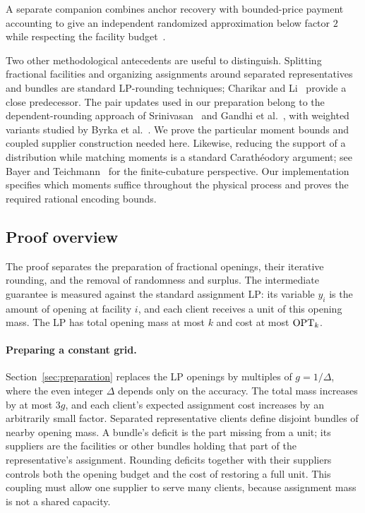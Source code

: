 A separate companion combines anchor recovery with bounded-price payment
accounting to give an independent randomized approximation below factor
\(2\) while respecting the facility budget~\cite[Theorem~1.2]{OpenAIRecovery2026}.

Two other methodological antecedents are useful to distinguish.
Splitting fractional facilities and organizing assignments around
separated representatives and bundles are standard LP-rounding
techniques; Charikar and Li~\cite{CharikarLi2012} provide a close
predecessor. The pair updates used in our preparation belong to the
dependent-rounding approach of Srinivasan~\cite{Srinivasan2001} and
Gandhi et al.~\cite{GandhiEtAl2006}, with weighted variants studied by
Byrka et al.~\cite{ByrkaEtAl2017}. We prove the particular moment bounds
and coupled supplier construction needed here. Likewise, reducing the
support of a distribution while matching moments is a standard
Carath\'eodory argument; see Bayer and Teichmann~\cite{BayerTeichmann2005}
for the finite-cubature perspective. Our implementation specifies which
moments suffice throughout the physical process and proves the required
rational encoding bounds.

\subsection{Proof overview}

The proof separates the preparation of fractional openings, their
iterative rounding, and the removal of randomness and surplus. The
intermediate guarantee is measured against the standard assignment LP:
its variable \(y_i\) is the amount of opening at facility \(i\), and each
client receives a unit of this opening mass. The LP has total opening
mass at most \(k\) and cost at most \(\operatorname{OPT}_k\).

\paragraph{Preparing a constant grid.}
Section~\ref{sec:preparation} replaces the LP openings by multiples of
\(g=1/\Delta\), where the even integer \(\Delta\) depends only on the
accuracy. The total mass increases by at most \(3g\), and each client's
expected assignment cost increases by an arbitrarily small factor.
Separated representative clients define disjoint bundles of nearby
opening mass. A bundle's deficit is the part missing from a unit; its
suppliers are the facilities or other bundles holding that part of the
representative's assignment. Rounding deficits together with their
suppliers controls both the opening budget and the cost of restoring a
full unit. This coupling must allow one supplier to serve many clients,
because assignment mass is not a shared capacity.

